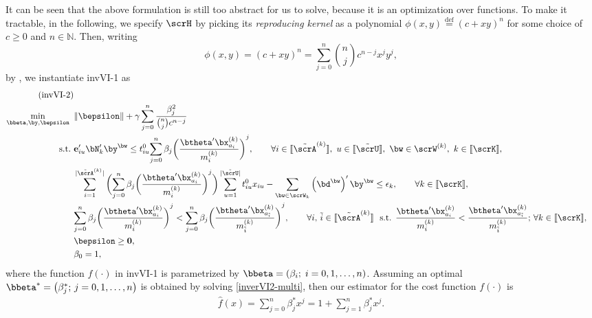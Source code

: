 \documentclass[3p]{elsarticle}
\newcommand*{\defeq}{\stackrel{\text{def}}{=}}
\begin{document}
It can be seen that the above formulation is still too abstract for us
to solve, because it is an optimization over functions. To make it
tractable, in the following, we specify $\scrH$ by picking its
\textit{reproducing kernel} \cite{evgeniou2000regularization} as a
polynomial ${\phi}(x, y) \defeq ( c + xy )^n$ for some choice of $c \geq
0$ and $n \in \mathbb{N}$. Then, writing
	\[\phi\left( {x,y} \right) = {\left( {c + xy} \right)^n} = \sum\limits_{j = 0}^n {{n \choose j}{c^{n - j}}{x^j}{y^j}}, \]
	by \cite[(3.2), (3.3), and (3.6)]{evgeniou2000regularization},
	we instantiate invVI-1 as \cite{CDC17} 
\begin{align}
	\text{(invVI-2)}  \notag \\
	\mathop {\min }\limits_{\bbeta ,\by,\bepsilon} {\text{  }}& \|\bepsilon\| + \gamma \sum\limits_{j = 0}^n {\frac{{\beta _j^2}}{{{n \choose j}{c^{n - j}}}}} \label{inverVI2-multi} \\
	\text{s.t.}{\text{  }}&{\textbf{e}}_{iu}'\bN'_k{\by^\bw} \leq t_{iu}^{{0}}{\sum\limits_{j = 0}^n {{\beta _j}\bigg( \frac{{{{\btheta}}'\bx_{a_i}^{{(k)}}}}{{{m_{i}^{{(k)}}}}} \bigg)} ^j}, \qquad \forall i \in [\kern-0.15em[ \tilde\scrA^{{(k)}} 
	]\kern-0.15em], ~u \in [\kern-0.15em[ \tilde\scrU 
	]\kern-0.15em], ~\bw \in {\scrW^{{(k)}}}, ~k \in [\kern-0.15em[ \scrK 
	]\kern-0.15em],  \notag \\
	&\sum\limits_{i=1}^{|\tilde\scrA^{{(k)}}|} {\bigg({\sum\limits_{j = 0}^n {{\beta _j}\bigg( \frac{{{{\btheta}}'\bx_{a_i}^{{(k)}}}}{{{m_{i}^{{(k)}}}}} \bigg)} ^j}\bigg)} \sum\limits_{u=1}^{|\tilde\scrU|} {t_{iu}^{{0}}{x_{iu}}} - \sum\limits_{\bw \in {\scrW_k}} {\left( {{\bd^\bw}} \right)'{\by^\bw}}  \leq {\epsilon_k},  \qquad \forall k \in [\kern-0.15em[ \scrK 
	]\kern-0.15em],  \notag \\
	&{\sum\limits_{j = 0}^n {{\beta _j}\bigg( \frac{{{{\btheta}}'\bx_{a_i}^{{(k)}}}}{{{m_{i}^{{(k)}}}}} \bigg)} ^j} < {\sum\limits_{j = 0}^n {{\beta _j}\bigg( \frac{{{{\btheta}}'\bx_{a_{\tilde i}}^{{(k)}}}}{{{m^{{(k)}}_{{\tilde i}}}}} \bigg)} ^j}, \qquad \forall i, \, \tilde{i} \in [\kern-0.15em[ \tilde\scrA^{{(k)}} 
	]\kern-0.15em]
	~{\text{ s}}{\text{.t}}{\text{. }}\frac{{{{\btheta}}'\bx_{a_i}^{{(k)}}}}{{{m_{i}^{{(k)}}}}} < \frac{{{{\btheta}}'\bx_{a_{\tilde i}}^{{(k)}}}}{{{m^{{(k)}}_{{\tilde i}}}}}; \,\forall k \in [\kern-0.15em[ \scrK 
	]\kern-0.15em],  \notag \\
	& \bepsilon \geq \textbf{0}, \notag \\
	&{\beta _0} = 1, \notag 
\end{align}
where the function $f(\cdot)$ in invVI-1 is parametrized by $\bbeta =
\left( {{\beta _i};\;i = 0, 1, \ldots ,n} \right)$.  Assuming an optimal
${\bbeta ^*} = \left( {\beta _j^*;\,j = 0,1, \ldots ,n} \right)$ is
obtained by solving \eqref{inverVI2-multi}, then our estimator for the
cost function $f(\cdot)$ is
\begin{align}
	\hat f\left( x \right) = \sum\limits_{j = 0}^n {\beta _j^*{x^j}}  = 1 + \sum\limits_{j = 1}^n {\beta _j^*{x^j}}.  \label{costEstimator}
\end{align}
	
\end{document}
